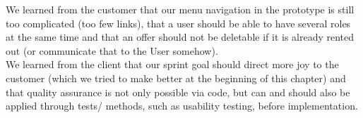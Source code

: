 We learned from the customer that our menu navigation in the prototype is still too complicated (too few links), that a user should be able to have several roles at the same time and that an offer should not be deletable if it is already rented out (or communicate that to the User somehow). \\
We learned from the client that our sprint goal should direct more joy to the customer (which we tried to make better at the beginning of this chapter) and that quality assurance is not only possible via code, but can and should also be applied through tests/ methods, such as usability testing, before implementation.